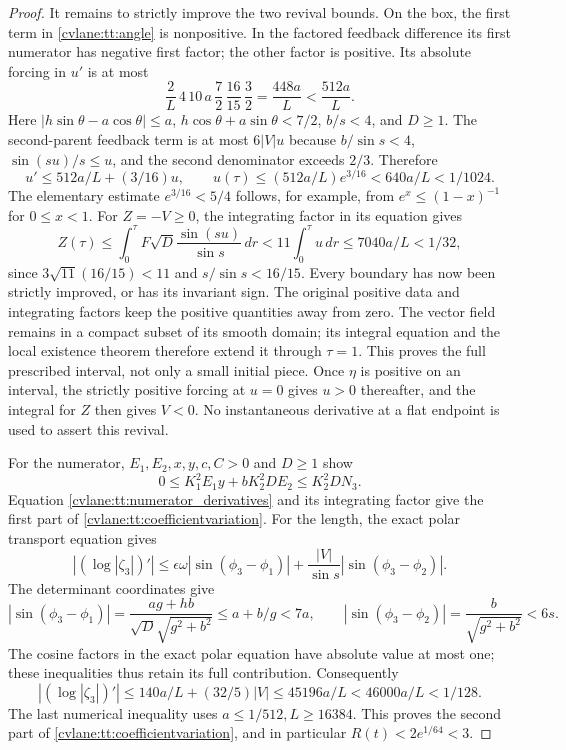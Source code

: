 \begin{proof}
It remains to strictly improve the two revival bounds. On the box,
the first term in \eqref{cvlane:tt:angle} is nonpositive. In the factored
feedback difference its first numerator has negative first factor;
the other factor is positive. Its absolute forcing in $u'$ is at most
\[
 \frac2L\,4\,10\,a\,\frac72\,\frac{16}{15}\,\frac32
 =\frac{448a}{L}<\frac{512a}{L}.
\]
Here $|h\sin\theta-a\cos\theta|\leq a$,
$h\cos\theta+a\sin\theta<7/2$, $b/s<4$, and $D\geq1$.
The second-parent feedback term is at most $6|V|u$ because
$b/\sin s<4$, $\sin(su)/s\leq u$, and the second denominator
exceeds $2/3$. Therefore
\[
 u'\leq512a/L+(3/16)u,\qquad
 u(\tau)\leq(512a/L)e^{3/16}<640a/L<1/1024.
\]
The elementary estimate $e^{3/16}<5/4$ follows, for example,
from $e^x\leq(1-x)^{-1}$ for $0\leq x<1$.
For $Z=-V\geq0$, the integrating factor in its equation gives
\[
 Z(\tau)\leq\int_0^\tau
      F\sqrt D\frac{\sin(su)}{\sin s}\,dr
 <11\int_0^\tau u\,dr\leq7040a/L<1/32,
\]
since $3\sqrt{11}(16/15)<11$ and $s/\sin s<16/15$.
Every boundary has now been strictly improved, or has its invariant
sign. The original positive data and integrating factors keep the
positive quantities away from zero. The vector field remains in a
compact subset of its smooth domain; its integral equation and the
local existence theorem therefore extend it through $\tau=1$.
This proves the full prescribed interval, not only a small initial
piece. Once $\eta$ is positive on an interval, the strictly positive
forcing at $u=0$ gives $u>0$ thereafter, and the integral for $Z$
then gives $V<0$. No instantaneous derivative at a flat endpoint is
used to assert this revival.

For the numerator, $E_1,E_2,x,y,c,C>0$ and $D\geq1$ show
\[
 0\leq K_1^2E_1y+bK_2^2DE_2\leq K_2^2D N_3.
\]
Equation \eqref{cvlane:tt:numerator_derivatives} and its integrating factor
give the first part of \eqref{cvlane:tt:coefficientvariation}.
For the length, the exact polar transport equation gives
\[
 \left|(\log|\zeta_3|)'\right|
 \leq\epsilon\omega|\sin(\phi_3-\phi_1)|
       +\frac{|V|}{\sin s}|\sin(\phi_3-\phi_2)|.
\]
The determinant coordinates give
\[
 |\sin(\phi_3-\phi_1)|=
 \frac{ag+hb}{\sqrt D\sqrt{g^2+b^2}}\leq a+b/g<7a,
 \qquad
 |\sin(\phi_3-\phi_2)|=\frac b{\sqrt{g^2+b^2}}<6s.
\]
The cosine factors in the exact polar equation have absolute value
at most one; these inequalities thus retain its full contribution.
Consequently
\[
 |(\log|\zeta_3|)'|
 \leq140a/L+(32/5)|V|\leq45196a/L<46000a/L<1/128.
\]
The last numerical inequality uses $a\leq1/512,L\geq16384$.
This proves the second part of \eqref{cvlane:tt:coefficientvariation}, and
in particular $R(t)<2e^{1/64}<3$.


\end{proof}
